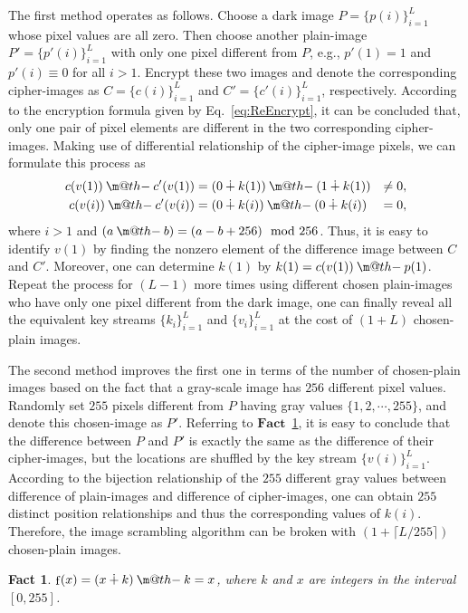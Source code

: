 \documentclass[smallextended, final]{svjour3}          \smartqed
\makeatletter
\newcommand{\dotminus}{\mathbin{\text{\@dotminus}}}
\newcommand{\@dotminus}{\ooalign{\hidewidth\raise1ex\hbox{.}\hidewidth\cr$\m@th-$\cr}}
\newtheorem{Fact}{Fact}
\DeclareMathOperator\f{f}
\makeatother
\begin{document}
The first method operates as follows.
Choose a dark image $P=\{p(i)\}_{i=1}^ {L}$ whose pixel values are all zero.
Then choose another plain-image $P'=\{p'(i)\}_{i=1}^ {L}$ with only one pixel different from $P$,
e.g., $p'(1)=1$ and $p'(i) \equiv 0$ for all $i>1$.
Encrypt these two images and denote the corresponding cipher-images as $C=\{c(i)\}_{i=1}^ {L}$ and $C'=\{c'(i)\}_{i=1}^ {L}$, respectively.
According to the encryption
formula given by Eq.~\eqref{eq:ReEncrypt}, it can be  concluded that,
only one pair of pixel elements are different in the two corresponding
cipher-images. Making use of differential relationship of the cipher-image pixels,
we can formulate this process as
\begin{eqnarray}
c(v(1)) \dotminus c'(v(1)) & =  (0 \dotplus k(1)) \dotminus (1 \dotplus k(1)) & \neq  0, \nonumber\\
c(v(i)) \dotminus c'(v(i)) & =  (0 \dotplus k(i)) \dotminus (0 \dotplus k(i)) & = 0, \nonumber
\end{eqnarray}
where $i>1$ and $(a \dotminus b)=(a-b+256) \mod 256$. Thus, it is easy to identify $v(1)$ by finding the nonzero element
of the difference image between $C$ and $C'$. Moreover, one can determine $k(1)$
by $k(1)= c(v(1)) \dotminus p(1)$.
Repeat the process for $(L-1)$ more times using different chosen plain-images who have
only one pixel different from the dark image, one can finally reveal all the
equivalent key streams $\{k_i\}_{i=1}^{L}$ and $\{v_i\}_{i=1}^{L}$ at the
cost of $(1+L)$ chosen-plain images.


The second method improves the first one in terms of the number of chosen-plain
images based on the fact that a gray-scale image has $256$ different pixel values.
Randomly set $255$ pixels different from $P$ having gray values $\{1,2,\cdots, 255\}$, and denote this chosen-image as $P'$.
Referring to $\mathbf{Fact}$~\ref{fact2}, it is easy to conclude that the difference between $P$ and $P'$ is exactly the same
as the difference of their cipher-images, but the locations are shuffled by the key stream  $\{v(i)\}_{i=1}^{L}$.
According to the bijection relationship of the $255$ different gray values between difference of plain-images and difference of cipher-images,
one can obtain $255$ distinct position relationships and thus the corresponding values of $k(i)$.
Therefore, the image scrambling algorithm can be broken with
$(1 + \lceil L/255\rceil)$ chosen-plain images.
\begin{Fact}
\label{fact2}
$\f(x) = (x \dotplus k) \dotminus k = x$, where $k$ and $x$ are integers in the interval $[0, 255]$.
\end{Fact}
\end{document}
